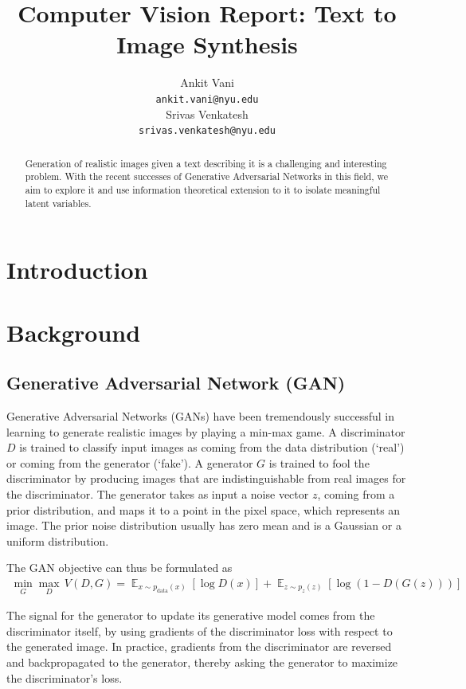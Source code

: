 \documentclass{article}
\title{Computer Vision Report: Text to Image Synthesis}
\author{
  Ankit Vani \\
  \texttt{ankit.vani@nyu.edu} \\
  \And
  Srivas Venkatesh \\
  \texttt{srivas.venkatesh@nyu.edu} \\
}
\DeclareMathOperator*{\E}{\mathbb{E}}
\let\cite=\supercite
\begin{document}
\maketitle

\begin{abstract}
  Generation of realistic images given a text describing it is a challenging and interesting problem. With the recent successes of Generative Adversarial Networks in this field, we aim to explore it and use information theoretical extension to it to isolate meaningful latent variables.
\end{abstract}


\section{Introduction}


\section{Background}

\subsection{Generative Adversarial Network (GAN)}

Generative Adversarial Networks (GANs) \cite{gan} have been tremendously successful in learning to generate realistic images by playing a min-max game. A discriminator $D$ is trained to classify input images as coming from the data distribution (`real') or coming from the generator (`fake'). A generator $G$ is trained to fool the discriminator by producing images that are indistinguishable from real images for the discriminator. The generator takes as input a noise vector $z$, coming from a prior distribution, and maps it to a point in the pixel space, which represents an image. The prior noise distribution usually has zero mean and is a Gaussian or a uniform distribution.

The GAN objective can thus be formulated as
\begin{align}
\min_G \max_D\, V(D,G) = \E_{x \sim p_{\text{data}}(x)}\left[\log D(x)\right] + \E_{z\sim p_z(z)}\left[\log(1-D(G(z)))\right] \label{eq:gan}
\end{align}

The signal for the generator to update its generative model comes from the discriminator itself, by using gradients of the discriminator loss with respect to the generated image. In practice, gradients from the discriminator are reversed and backpropagated to the generator, thereby asking the generator to maximize the discriminator's loss.
\end{document}
